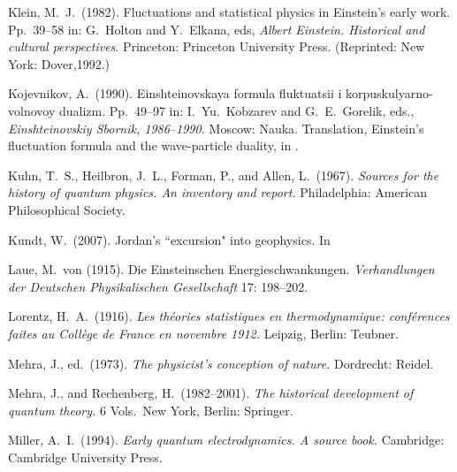 \documentclass[12pt]{elsart}
\begin{document}
{\begin{thebibliography}{}
  Klein, M.\ J.\ (1982). Fluctuations and statistical physics in Einstein's early work. Pp.\ 39--58 in: G.\ Holton and Y.\ Elkana, eds, {\it Albert Einstein. Historical and cultural perspectives}. Princeton: Princeton University Press. (Reprinted: New York: Dover,1992.)

  Kojevnikov, A.\ (1990). Einshteinovskaya formula fluktuatsii i korpuskulyarno-volnovoy dualizm. Pp.\ 49--97 in: I.\ Yu.\ Kobzarev and G.\ E.\ Gorelik, eds., {\it Einshteinovskiy Sbornik, 1986--1990.} Moscow: Nauka. Translation, Einstein's fluctuation formula and the wave-particle duality, in \citep[pp.\ 181-228]{Balashov and Vizgin 2002}.

 Kuhn, T.\ S., Heilbron, J.\ L., Forman, P., and Allen, L.\ (1967). {\it Sources for the history of quantum physics. An inventory and report.} Philadelphia: American Philosophical Society.

  Kundt, W.\ (2007). Jordan's ``excursion" into geophysics. In \citep[123--131]{Hoffmann 2007}



 Laue, M.\ von (1915). Die Einsteinschen Energieschwankungen. {\it Verhandlungen der Deutschen Physikalischen Gesellschaft} 17: 198--202.

 Lorentz, H.\ A.\ (1916). {\it Les th\'eories statistiques en thermodynamique: conf\'erences faites au Coll\`ege de France en novembre 1912.} Leipzig, Berlin: Teubner.

 Mehra, J., ed.\ (1973).  {\it The physicist's conception of nature.} Dordrecht: Reidel. 

 Mehra, J., and Rechenberg, H.\ (1982--2001). {\it The historical development of quantum theory.} 6 Vols.\ New York, Berlin: Springer.

 Miller, A.\ I.\ (1994). {\it Early quantum electrodynamics. A source book.} Cambridge: Cambridge University Press.


\end{thebibliography}}
\end{document}
